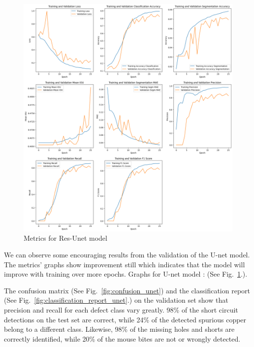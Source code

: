 \documentclass[12pt]{article}
\begin{document}
\begin{figure}[H]
    \centering
    \includegraphics[width=\textwidth, keepaspectratio]{./graphics/graphs_vertical.png}
    \caption{Metrics for Res-Unet model}
    \label{fig:graphs_unet}
\end{figure}
\restoregeometry
\clearpage


We can observe some encouraging results from the validation of the U-net model. The metrics' graphs show improvement still which indicates that the model will improve with training over more epochs. 
Graphs for U-net model : (See Fig.~\ref{fig:graphs_unet}.).

The confusion matrix (See Fig.~\ref{fig:confusion_unet}) and the classification report (See Fig.~\ref{fig:classification_report_unet}.) on the validation set show that precision and recall for each defect class vary greatly. 98\% of the short circuit detections on the test set are correct, while 24\% of the detected spurious copper belong to a different class. Likewise, 98\% of the missing holes and shorts are correctly identified, while 20\% of the mouse bites are not or wrongly detected.
\end{document}
